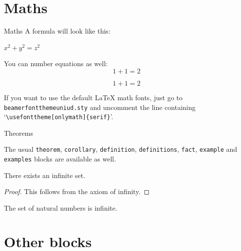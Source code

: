 \documentclass{article}
\begin{document}
\section{Maths}

\begin{frame}{Maths}
A formula will look like this: 
\begin{center}
 $x^2 + y^2 = z^2$
\end{center}

You can number equations as well:
\begin{equation}
1+1=2
\end{equation}

\begin{equation}
1+1=2 \tag{custom label!}
\end{equation}

\vskip 0.5cm

If you want to use the default \LaTeX{} math fonts, just go to \texttt{beamerfontthemeuniud.sty} and uncomment the line containing `\texttt{\textbackslash usefonttheme[onlymath]\{serif\}}'.

\end{frame}

\begin{frame}{Theorems}

The usual \texttt{theorem}, \texttt{corollary}, \texttt{definition}, \texttt{definitions}, \texttt{fact}, \texttt{example} and \texttt{examples} blocks are available as well.

\begin{theorem}
There exists an infinite set.
\end{theorem}
\begin{proof}
This follows from the axiom of infinity.
\end{proof}
\begin{example}
The set of natural numbers is infinite.
\end{example}

\end{frame}

\section{Other blocks}
\end{document}
